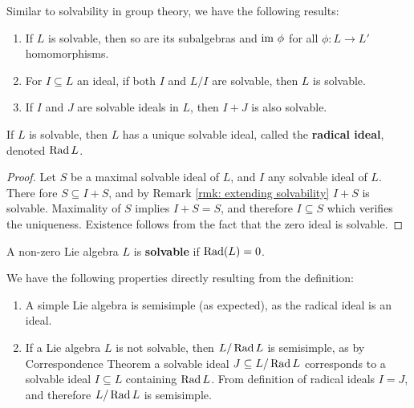 \documentclass{article}
\begin{document}
\begin{remark}\label{rmk: extending solvability}
    Similar to solvability in group theory, we have the following results:
    \begin{enumerate}
        \item If $L$ is solvable, then so are its subalgebras and $\mathrm{im}\  \phi$ for all $\phi: L \to L'$ homomorphisms.
        \item For $I \subseteq L$ an ideal, if both $I$ and $L/I$ are solvable, then $L$ is solvable.
        \item If $I$ and $J$ are solvable ideals in $L$, then $I + J$ is also solvable.   
    \end{enumerate}
\end{remark}

\begin{corollary}
    If $L$ is solvable, then $L$ has a unique solvable ideal, called the \textbf{radical ideal}, denoted $\operatorname{Rad} L$.
\end{corollary}

\begin{proof}
    Let $S$ be a maximal solvable ideal of $L$, and $I$ any solvable ideal of $L$. There fore $S \subseteq I + S$, and by Remark \ref{rmk: extending solvability} $I + S$ is solvable. Maximality of $S$ implies $I + S = S$, and therefore $I \subseteq S$ which verifies the uniqueness. Existence follows from the fact that the zero ideal is solvable.
\end{proof}

\begin{definition}
    A non-zero Lie algebra $L$ is \textbf{solvable} if $\operatorname{Rad}(L) = 0$.
\end{definition}

\begin{remark}
    We have the following properties directly resulting from the definition:
    \begin{enumerate}
        \item A simple Lie algebra is semisimple (as expected), as the radical ideal is an ideal.
        \item If a Lie algebra $L$ is not solvable, then $L/\operatorname{Rad} L$ is semisimple, as by Correspondence Theorem a solvable ideal $J \subseteq L/\operatorname{Rad} L$ corresponds to a solvable ideal $I \subseteq L$ containing $\operatorname{Rad} L$. From definition of radical ideals $I = J$, and therefore $L/\operatorname{Rad} L$ is semisimple.
    \end{enumerate}
\end{remark}
\end{document}
